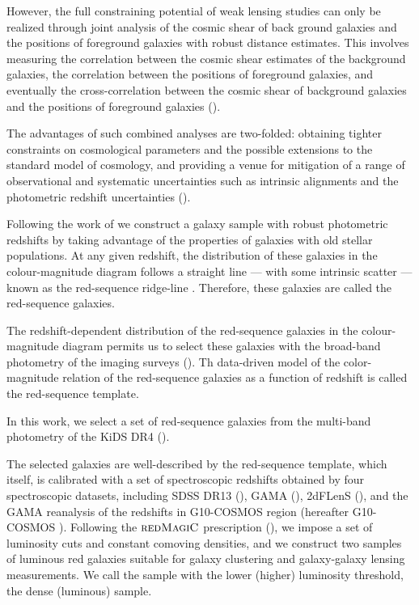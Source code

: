 \documentclass[fleqn,usenatbib,useAMS]{mnras}
\begin{document}
However, the full constraining potential of weak lensing studies can only be realized through joint 
analysis of the cosmic shear of back ground galaxies and the positions of foreground galaxies with robust distance estimates. This involves measuring the correlation between the cosmic shear estimates of the background galaxies, the correlation between the positions of foreground galaxies, and eventually the cross-correlation between the cosmic shear of background galaxies and the positions of foreground galaxies (\citealt{cacciato2013, cosmolike, des_y1_cosmology, elvin2017, edo2018, prat2017}). 

The advantages of such combined analyses are two-folded: obtaining tighter constraints on cosmological parameters and the possible extensions to the standard model of cosmology, and providing a venue for mitigation of a range of observational and systematic uncertainties such as intrinsic alignments and the photometric redshift uncertainties (\citealt{edo2016, joudaki2018, sam2019}).

Following the work of \citet{vakili2019} we construct a galaxy sample with robust photometric redshifts by taking advantage of the properties of galaxies with old stellar populations. At any given redshift, the distribution of these galaxies in the colour-magnitude diagram follows a straight line --- with some intrinsic scatter --- known as the red-sequence ridge-line \citep[e.g.][]{bower1992,ellis1997,gladders1998,stanford1998}. Therefore, these galaxies are called the red-sequence galaxies. 

The redshift-dependent distribution of the red-sequence galaxies in the colour-magnitude diagram permits us to select these galaxies with the broad-band photometry of the imaging surveys (\citealt{gladders_yee2000,hao2009,redmap_sdss,rozo2016,elvin2017,oguri2018,vakili2019}). Th data-driven model of the color-magnitude relation of the red-sequence galaxies as a function of redshift is called the red-sequence template.

In this work, we select a set of red-sequence galaxies from the multi-band photometry of the KiDS DR4 (\citealt{kuijken2019}). 

The selected galaxies are well-described by the red-sequence template, which itself, is calibrated with a set of spectroscopic redshifts obtained by four spectroscopic datasets, including SDSS DR13 (\citealt{sdss_dr13}), GAMA (\citealt{driver2011}), 2dFLenS (\citealt{blake2016}), and the GAMA reanalysis of the redshifts in G10-COSMOS region (hereafter G10-COSMOS \citealt{davis2015}). Following the $\textsc{redMagiC}$ prescription (\citealt{rozo2016}), we impose a set of luminosity cuts and constant comoving densities, and we construct two samples of luminous red galaxies suitable for galaxy clustering and galaxy-galaxy lensing measurements. We call the sample with the lower (higher) luminosity threshold, the dense (luminous) sample.
\end{document}
